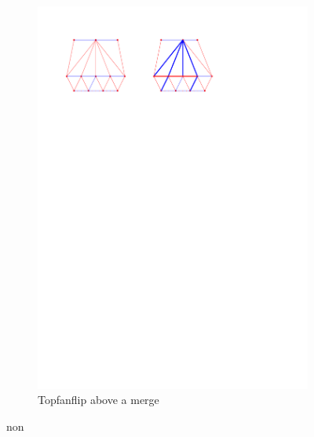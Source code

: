 \begin{figure}
    \centering
    \begin{subfigure}[b]{0.45 \textwidth}
        \includegraphics[width = \textwidth]{topFanFlips/img/merge}
        \caption{Topfanflip above a merge}
    \end{subfigure}non
    ~
    \begin{subfigure}[b]{0.45 \textwidth}

\end{subfigure}
\end{figure}
